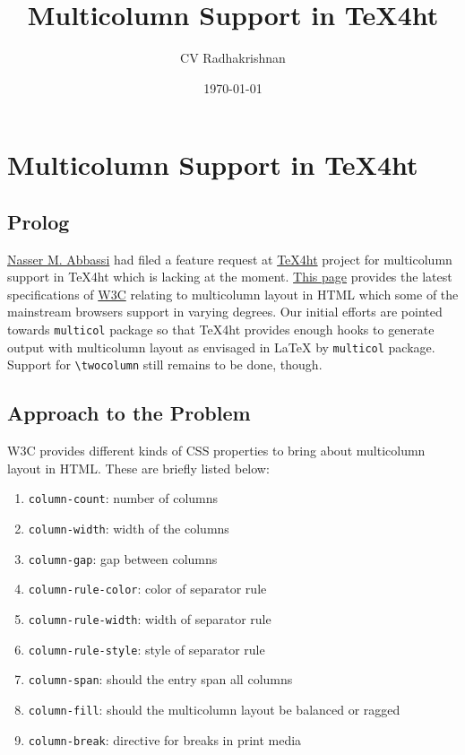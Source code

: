\documentclass{article}
\author{CV Radhakrishnan}
\date{\today}
\title{Multicolumn Support in TeX4ht}
\begin{document}
\maketitle
\tableofcontents
\else
\chapter{Multicolumn Support in \TeX4ht}
\fi

\section*{Prolog}
\label{sec-1}

\href{http://www.12000.org/}{Nasser M. Abbassi} had filed a feature request at \href{http://puszcza.gnu.org.ua/bugs/?188}{TeX4ht} project for
multicolumn support in TeX4ht which is lacking at the moment. \href{http://www.w3.org/TR/css3-multicol/}{This
page} provides the latest specifications of \href{http://www.w3.org}{W3C} relating to multicolumn
layout in HTML which some of the mainstream browsers support in
varying degrees.  Our initial efforts are pointed towards \texttt{multicol}
package so that TeX4ht provides enough hooks to generate output with
multicolumn layout as envisaged in \LaTeX{} by \texttt{multicol} package.
Support for \texttt{\textbackslash{}twocolumn} still remains to be done, though.

\section*{Approach to the Problem}
\label{sec-2}

W3C provides different kinds of CSS properties to bring about
multicolumn layout in HTML. These are briefly listed below:

\begin{enumerate}
\item \texttt{column-count}: number of columns
\item \texttt{column-width}: width of the columns
\item \texttt{column-gap}: gap between columns
\item \texttt{column-rule-color}: color of separator rule
\item \texttt{column-rule-width}: width of separator rule
\item \texttt{column-rule-style}: style of separator rule
\item \texttt{column-span}: should the entry span all columns
\item \texttt{column-fill}: should the multicolumn layout be balanced or ragged
\item \texttt{column-break}: directive for breaks in print media
\end{enumerate}
\end{document}
